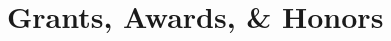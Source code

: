 \documentclass[letterpaper]{article}
\newenvironment{publist}{%
  \begin{list}{}{%
    \setlength{\leftmargin}{0cm}   %
    \setlength{\labelwidth}{2cm}     %
    \setlength{\labelsep}{0.5cm}     %
  }%
}{%
  \end{list}%
}
\begin{document}
\begin{publist}




\end{publist}

\section*{\textbf{Grants, Awards, \& Honors}}
\end{document}
